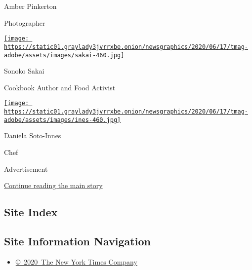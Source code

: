 Amber Pinkerton

Photographer

\href{https://www.nytimes3xbfgragh.onion/2020/08/10/t-magazine/sonoko-sakai-chef-cooking-soba.html}{\texttt{[image: https://static01.graylady3jvrrxbe.onion/newsgraphics/2020/06/17/tmag-adobe/assets/images/sakai-460.jpg]}}

Sonoko Sakai

Cookbook Author and Food Activist

\href{https://www.nytimes3xbfgragh.onion/2020/08/10/t-magazine/daniela-soto-innes-cooking-chef.html}{\texttt{[image: https://static01.graylady3jvrrxbe.onion/newsgraphics/2020/06/17/tmag-adobe/assets/images/ines-460.jpg]}}

Daniela Soto-Innes

Chef

Advertisement

\protect\hyperlink{after-bottom}{Continue reading the main story}

\hypertarget{site-index}{%
\subsection{Site Index}\label{site-index}}

\hypertarget{site-information-navigation}{%
\subsection{Site Information
Navigation}\label{site-information-navigation}}

\begin{itemize}
\tightlist
\item
  \href{https://help.nytimes3xbfgragh.onion/hc/en-us/articles/115014792127-Copyright-notice}{©~2020~The
  New York Times Company}
\end{itemize}

